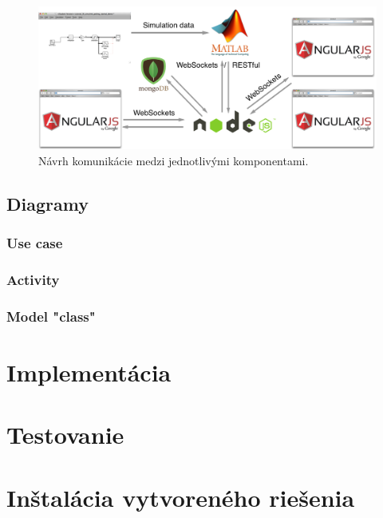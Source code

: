 \begin{figure}[H]
  \centering
  \includegraphics[scale=0.4]{img/software-design.png}
  \caption{Návrh komunikácie medzi jednotlivými komponentami.}
  \label{img-software-designl}
\end{figure}

\subsection{Diagramy}
\subsubsection{Use case}
\subsubsection{Activity}
\subsubsection{Model "class"}


\section{Implementácia}

\section{Testovanie}

\section{Inštalácia vytvoreného riešenia}